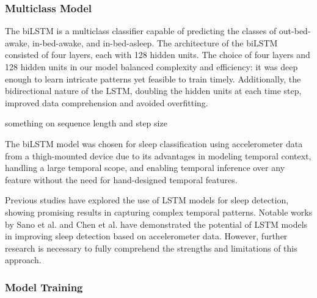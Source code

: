 \documentclass[
  super,
  preprint,
  3p]{elsarticle}
\begin{document}
\hypertarget{multiclass-model}{%
\subsubsection{Multiclass Model}\label{multiclass-model}}

The biLSTM is a multiclass classifier capable of predicting the classes
of out-bed-awake, in-bed-awake, and in-bed-asleep. The architecture of
the biLSTM consisted of four layers, each with 128 hidden units. The
choice of four layers and 128 hidden units in our model balanced
complexity and efficiency: it was deep enough to learn intricate
patterns yet feasible to train timely. Additionally, the bidirectional
nature of the LSTM, doubling the hidden units at each time step,
improved data comprehension and avoided overfitting.

something on sequence length and step size

The biLSTM model was chosen for sleep classification using accelerometer
data from a thigh-mounted device due to its advantages in modeling
temporal context, handling a large temporal scope, and enabling temporal
inference over any feature without the need for hand-designed temporal
features.

Previous studies have explored the use of LSTM models for sleep
detection, showing promising results in capturing complex temporal
patterns. Notable works by Sano et al. \citep{sano2019} and Chen et al.
\citep{chen2021} have demonstrated the potential of LSTM models in
improving sleep detection based on accelerometer data. However, further
research is necessary to fully comprehend the strengths and limitations
of this approach.

\hypertarget{model-training}{%
\subsubsection{Model Training}\label{model-training}}
\end{document}
